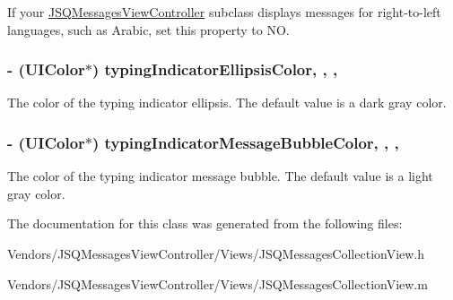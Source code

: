 If your {\ttfamily \hyperlink{interface_j_s_q_messages_view_controller}{J\+S\+Q\+Messages\+View\+Controller}} subclass displays messages for right-\/to-\/left languages, such as Arabic, set this property to {\ttfamily N\+O}. \hypertarget{interface_j_s_q_messages_collection_view_a5a31d52d9d888bdae722bf7e0239a052}{}
\subsubsection[{typing\+Indicator\+Ellipsis\+Color}]{\setlength{\rightskip}{0pt plus 5cm}-\/ (U\+I\+Color$\ast$) typing\+Indicator\+Ellipsis\+Color\hspace{0.3cm}{\ttfamily [read]}, {\ttfamily [write]}, {\ttfamily [nonatomic]}, {\ttfamily [strong]}}\label{interface_j_s_q_messages_collection_view_a5a31d52d9d888bdae722bf7e0239a052}
The color of the typing indicator ellipsis. The default value is a dark gray color. \hypertarget{interface_j_s_q_messages_collection_view_a90851cfff181102d505f4df2e784eef8}{}
\subsubsection[{typing\+Indicator\+Message\+Bubble\+Color}]{\setlength{\rightskip}{0pt plus 5cm}-\/ (U\+I\+Color$\ast$) typing\+Indicator\+Message\+Bubble\+Color\hspace{0.3cm}{\ttfamily [read]}, {\ttfamily [write]}, {\ttfamily [nonatomic]}, {\ttfamily [strong]}}\label{interface_j_s_q_messages_collection_view_a90851cfff181102d505f4df2e784eef8}
The color of the typing indicator message bubble. The default value is a light gray color. 

The documentation for this class was generated from the following files\+:\begin{DoxyCompactItemize}
\item 
Vendors/\+J\+S\+Q\+Messages\+View\+Controller/\+Views/J\+S\+Q\+Messages\+Collection\+View.\+h\item 
Vendors/\+J\+S\+Q\+Messages\+View\+Controller/\+Views/J\+S\+Q\+Messages\+Collection\+View.\+m\end{DoxyCompactItemize}
